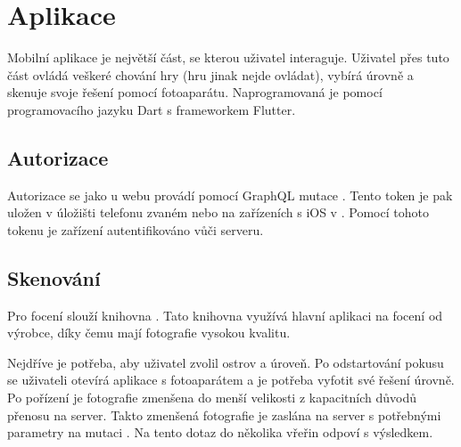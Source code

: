 \section{Aplikace}
Mobilní aplikace je největší část, se kterou uživatel interaguje. Uživatel přes tuto část ovládá veškeré chování hry (hru jinak nejde ovládat), vybírá úrovně a skenuje svoje řešení pomocí fotoaparátu. Naprogramovaná je pomocí programovacího jazyku Dart s frameworkem Flutter. 

\subsection{Autorizace}
Autorizace se jako u webu provádí pomocí GraphQL mutace . Tento token je pak uložen v úložišti telefonu zvaném \cite{SharedPreferences} nebo na zařízeních s iOS v \cite{NSUserDefaults}. Pomocí tohoto tokenu je zařízení autentifikováno vůči serveru.

\subsection{Skenování}
Pro focení slouží knihovna \cite{ImagePicker}. Tato knihovna využívá hlavní aplikaci na focení od výrobce, díky čemu mají fotografie vysokou kvalitu.\par
Nejdříve je potřeba, aby uživatel zvolil ostrov a úroveň. Po odstartování pokusu se uživateli otevírá aplikace s fotoaparátem a je potřeba vyfotit své řešení úrovně. Po pořízení je fotografie zmenšena do menší velikosti z kapacitních důvodů přenosu na server. Takto zmenšená fotografie je zaslána na server s potřebnými parametry na mutaci . Na tento dotaz do několika vřeřin odpoví s výsledkem.
